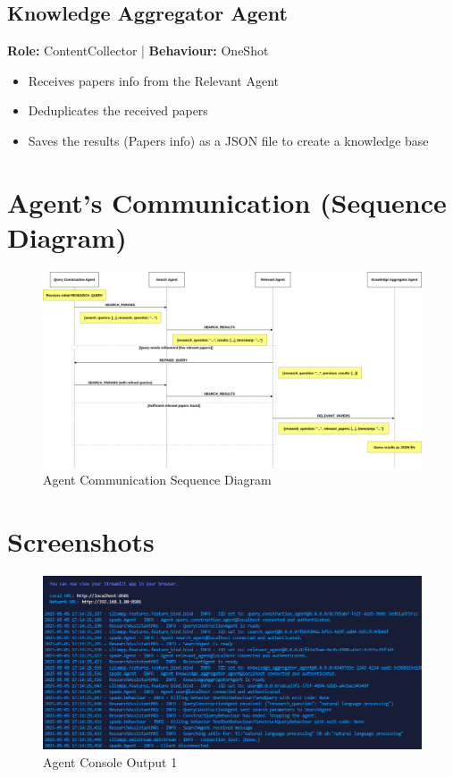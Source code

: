 \documentclass{article}
\begin{document}
\subsection{Knowledge Aggregator Agent}

\textbf{Role:} ContentCollector | \textbf{Behaviour:} OneShot

\begin{itemize}
  \item Receives papers info from the Relevant Agent
  \item Deduplicates the received papers
  \item Saves the results (Papers info) as a JSON file to create a knowledge base
\end{itemize}

\section*{Agent's Communication (Sequence Diagram)}

\begin{figure}[H]
    \centering
    \includegraphics[width=\textwidth]{images/agent_communication.png}
    \caption{Agent Communication Sequence Diagram}
    \label{fig:agent-communication}
\end{figure}

\section*{Screenshots}

\begin{figure}[H]
    \centering
    \includegraphics[width=\textwidth]{images/screenshot_1.png}
    \caption{Agent Console Output 1}
    \label{fig:screenshot1}
\end{figure}
\end{document}
